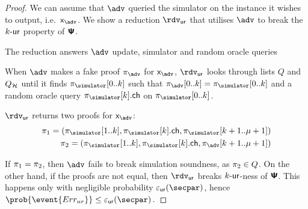 \begin{proof}
  We can assume that $\adv$ queried the simulator on the instance it wishes to
  output, i.e.~$\inp_{\adv}$. We show a reduction $\rdvur$  that utilises $\adv$ to break the
  ${k\text{-}\mathsf{ur}}$ property of $\bm{\mathsf{\Psi}}$. 
  \begin{compactitem}
  \item The reduction answers $\adv$ update, simulator and random oracle queries
     
  \item {}
  \item When $\adv$ makes a fake proof $\zkproof_{\adv}$ for $\inp_{\adv}$, $\rdvur$
    looks through lists $Q$ and $Q_{\mathcal{H}}$ until it finds $\zkproof_{\simulator}[0..k]$
    such that $\zkproof_{\adv}[0..k] = \zkproof_{\simulator}[0..k]$ and a random
    oracle query $\zkproof_{\simulator}[k].\ch$ on $\zkproof_{\simulator}[0..k]$.
  \item $\rdvur$ returns two proofs for $\inp_{\adv}$:
  	\begin{align*}
      \zkproof_1 = (\zkproof_{\simulator}[1..k],
      \zkproof_{\simulator}[k].\ch, \zkproof_{\simulator}[k + 1..\mu + 1])\\
      \zkproof_2 = (\zkproof_{\simulator}[1..k],
      \zkproof_{\simulator}[k].\ch, \zkproof_{\adv}[k + 1..\mu + 1])
  	\end{align*}
  \end{compactitem}
  If $\pi_1 = \pi_2$, then $\adv$ fails to break simulation soundness, as
  $\pi_2 \in Q$. On the other hand, if the proofs are not equal, then $\rdvur$
  breaks ${k\text{-}\mathsf{ur}}$-ness of $\bm{\mathsf{\Psi}}$. This happens only with negligible probability
  $\epsur(\secpar)$, hence \( \prob{\event{\errur}} \leq \epsur(\secpar)\,. \)

\end{proof}
